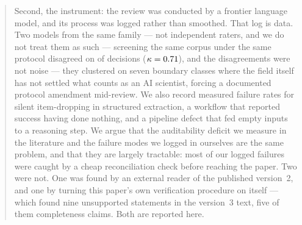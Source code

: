 \documentclass[11pt]{article}
\begin{document}
\begin{abstract}
Second, the instrument: the review was conducted by a frontier language model, and its
process was logged rather than smoothed. That log is data. Two models from the same family
--- not independent raters, and we do not treat them as such --- screening the same corpus
under the same protocol disagreed on \pctAdjudicate{} of decisions
($\kappa = \kappaThree{}$), and the disagreements were not noise --- they clustered on seven
boundary classes where the field itself has not settled what counts as an AI scientist,
forcing a documented protocol amendment mid-review. We also record measured failure rates
for silent item-dropping in structured extraction, a workflow that reported success having
done nothing, and a pipeline defect that fed empty inputs to a reasoning step. We argue that
the auditability deficit we measure in the literature and the failure modes we logged in
ourselves are the same problem, and that they are largely tractable: most of our logged
failures were caught by a cheap reconciliation check before reaching the paper. Two were
not. One was found by an external reader of the published version~2, and one by turning this
paper's own verification procedure on itself --- which found nine unsupported statements in
the version~3 text, five of them completeness claims. Both are reported here.
\end{abstract}









\end{document}
